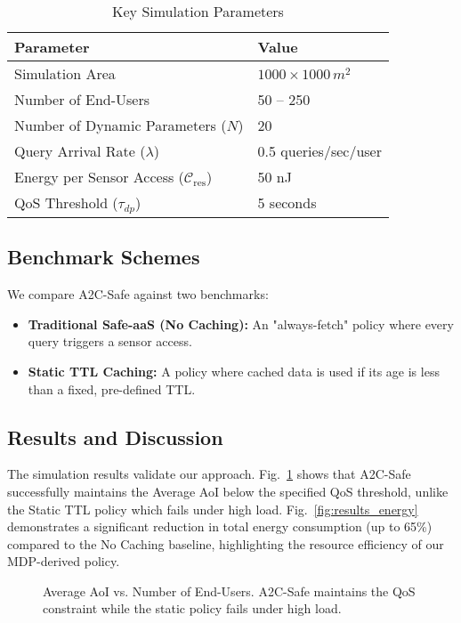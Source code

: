 \documentclass[journal]{IEEEtran}
\begin{document}
\begin{table}[!t]
    \renewcommand{\arraystretch}{1.3}
    \caption{Key Simulation Parameters}
    \label{tab:sim_params}
    \centering
    \begin{tabular}{l l}
        \hline
        \textbf{Parameter} & \textbf{Value} \\
        \hline
        Simulation Area & $1000 \times 1000 \, m^2$ \\
        Number of End-Users & 50 -- 250 \\
        Number of Dynamic Parameters ($N$) & 20 \\
        Query Arrival Rate ($\lambda$) & 0.5 queries/sec/user \\
        Energy per Sensor Access ($\mathcal{C}_{\text{res}}$) & 50 nJ \\
        QoS Threshold ($\tau_{dp}$) & 5 seconds \\
        \hline
    \end{tabular}
\end{table}

\subsection{Benchmark Schemes}
We compare A2C-Safe against two benchmarks:
\begin{itemize}
    \item \textbf{Traditional Safe-aaS (No Caching):} An "always-fetch" policy where every query triggers a sensor access.
    \item \textbf{Static TTL Caching:} A policy where cached data is used if its age is less than a fixed, pre-defined TTL.
\end{itemize}

\subsection{Results and Discussion}
The simulation results validate our approach. Fig.~\ref{fig:results_aoi} shows that A2C-Safe successfully maintains the Average AoI below the specified QoS threshold, unlike the Static TTL policy which fails under high load. Fig.~\ref{fig:results_energy} demonstrates a significant reduction in total energy consumption (up to 65\%) compared to the No Caching baseline, highlighting the resource efficiency of our MDP-derived policy.

\begin{figure}[!t]
    \centering
    \caption{Average AoI vs. Number of End-Users. A2C-Safe maintains the QoS constraint while the static policy fails under high load.}
    \label{fig:results_aoi}
\end{figure}
\end{document}
